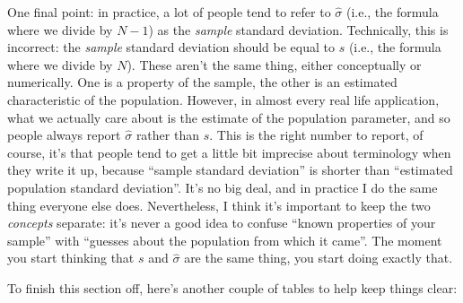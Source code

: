 \documentclass[spanish,]{book}
\begin{document}
One final point: in practice, a lot of people tend to refer to
\(\hat{\sigma}\) (i.e., the formula where we divide by \(N-1\)) as the
\emph{sample} standard deviation. Technically, this is incorrect: the
\emph{sample} standard deviation should be equal to \(s\) (i.e., the
formula where we divide by \(N\)). These aren't the same thing, either
conceptually or numerically. One is a property of the sample, the other
is an estimated characteristic of the population. However, in almost
every real life application, what we actually care about is the estimate
of the population parameter, and so people always report \(\hat\sigma\)
rather than \(s\). This is the right number to report, of course, it's
that people tend to get a little bit imprecise about terminology when
they write it up, because ``sample standard deviation'' is shorter than
``estimated population standard deviation''. It's no big deal, and in
practice I do the same thing everyone else does. Nevertheless, I think
it's important to keep the two \emph{concepts} separate: it's never a
good idea to confuse ``known properties of your sample'' with ``guesses
about the population from which it came''. The moment you start thinking
that \(s\) and \(\hat\sigma\) are the same thing, you start doing
exactly that.

To finish this section off, here's another couple of tables to help keep
things clear:
\end{document}
